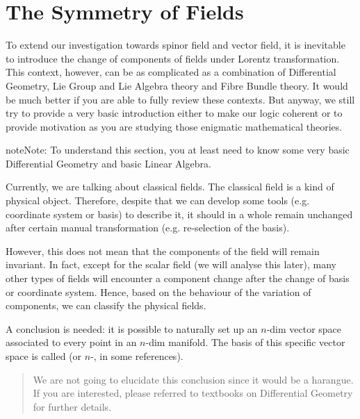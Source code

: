 \documentclass[letterpaper,10pt,english]{sphinxmanual}
\begin{document}
\section{The Symmetry of Fields}
\label{\detokenize{clstheo_sym_field::doc}}\label{\detokenize{clstheo_sym_field:the-symmetry-of-fields}}
To extend our investigation towards spinor field and vector field, it is inevitable to introduce the change of components of fields under Lorentz transformation. This context, however, can be as complicated as a combination of Differential Geometry, Lie Group and Lie Algebra theory and Fibre Bundle theory. It would be much better if you are able to fully review these contexts. But anyway, we still try to provide a very basic introduction either to make our logic coherent or to provide motivation as you are studying those enigmatic mathematical theories.

\begin{sphinxadmonition}{note}{Note:}
To understand this section, you at least need to know some very basic Differential Geometry and basic Linear Algebra.
\end{sphinxadmonition}

Currently, we are talking about classical fields. The classical field is a kind of physical object. Therefore, despite that we can develop some tools (e.g. coordinate system or basis) to describe it, it should in a whole remain unchanged after certain manual transformation (e.g. re-selection of the basis).

However, this does not mean that the components of the field will remain invariant. In fact, except for the scalar field (we will analyse this later), many other types of fields will encounter a component change after the change of basis or coordinate system. Hence, based on the behaviour of the variation of components, we can classify the physical fields.

A conclusion is needed: it is possible to naturally set up an \(n\)-dim vector space associated to every point in an \(n\)-dim manifold. The basis of this specific vector space is called  (or \(n\)-,  in some references).
\begin{quote}

We are not going to elucidate this conclusion since it would be a harangue. If you are interested, please referred to textbooks on Differential Geometry for further details.
\end{quote}
\end{document}
